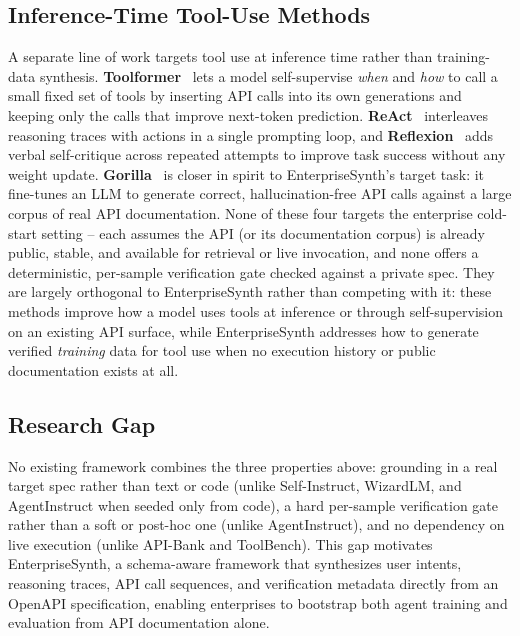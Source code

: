 \documentclass[11pt]{article}
\begin{document}
\subsection{Inference-Time Tool-Use Methods}
A separate line of work targets tool use at inference time rather than training-data synthesis.
\textbf{Toolformer}~\cite{schick2023toolformer} lets a model self-supervise \textit{when} and
\textit{how} to call a small fixed set of tools by inserting API calls into its own generations and
keeping only the calls that improve next-token prediction. \textbf{ReAct}~\cite{yao2023react}
interleaves reasoning traces with actions in a single prompting loop, and
\textbf{Reflexion}~\cite{shinn2023reflexion} adds verbal self-critique across repeated attempts to
improve task success without any weight update. \textbf{Gorilla}~\cite{patil2023gorilla} is closer
in spirit to EnterpriseSynth's target task: it fine-tunes an LLM to generate correct,
hallucination-free API calls against a large corpus of real API documentation. None of these four
targets the enterprise cold-start setting -- each assumes the API (or its documentation corpus) is
already public, stable, and available for retrieval or live invocation, and none offers a
deterministic, per-sample verification gate checked against a private spec. They are largely
orthogonal to EnterpriseSynth rather than competing with it: these methods improve how a model uses
tools at inference or through self-supervision on an existing API surface, while EnterpriseSynth
addresses how to generate verified \textit{training} data for tool use when no execution history or
public documentation exists at all.

\subsection{Research Gap}
No existing framework combines the three properties above: grounding in a real target spec rather
than text or code (unlike Self-Instruct, WizardLM, and AgentInstruct when seeded only from code), a
hard per-sample verification gate rather than a soft or post-hoc one (unlike AgentInstruct), and no
dependency on live execution (unlike API-Bank and ToolBench). This gap motivates EnterpriseSynth, a
schema-aware framework that synthesizes user intents, reasoning traces, API call sequences, and
verification metadata directly from an OpenAPI specification, enabling enterprises to bootstrap
both agent training and evaluation from API documentation alone.
\end{document}
